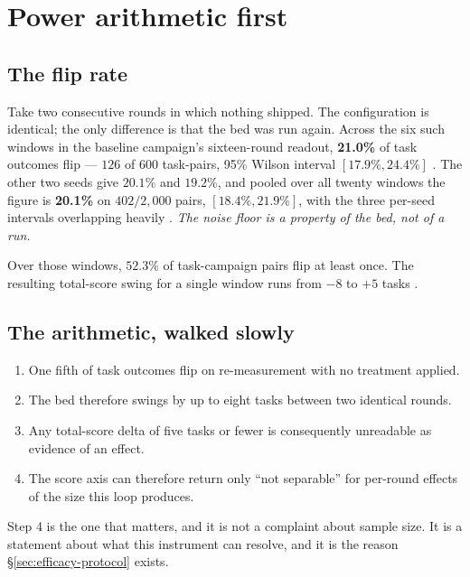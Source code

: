 \section{Power arithmetic first}
\label{sec:power}

\subsection*{The flip rate}

Take two consecutive rounds in which nothing shipped. The configuration is
identical; the only difference is that the bed was run again. Across the
six such windows in the baseline campaign's sixteen-round readout,
\textbf{21.0\%} of task outcomes flip --- $126$ of $600$ task-pairs, 95\%
Wilson interval $[17.9\%, 24.4\%]$ . The other two seeds give
$20.1\%$ and $19.2\%$, and pooled over all twenty windows the figure is
\textbf{20.1\%} on $402/2{,}000$ pairs, $[18.4\%, 21.9\%]$, with the three
per-seed intervals overlapping heavily . \emph{The noise floor is a
property of the bed, not of a run.}

Over those windows, $52.3\%$ of task-campaign pairs flip at least once.
The resulting total-score swing for a single window runs from $-8$ to
$+5$ tasks .

\subsection*{The arithmetic, walked slowly}

\begin{enumerate}
  \item One fifth of task outcomes flip on re-measurement with no treatment
        applied.
  \item The bed therefore swings by up to eight tasks between two
        identical rounds.
  \item Any total-score delta of five tasks or fewer is consequently
        unreadable as evidence of an effect.
  \item The score axis can therefore return only ``not separable'' for
        per-round effects of the size this loop produces.
\end{enumerate}

Step 4 is the one that matters, and it is not a complaint about sample
size. It is a statement about what this instrument can resolve, and it is
the reason \S\ref{sec:efficacy-protocol} exists.

